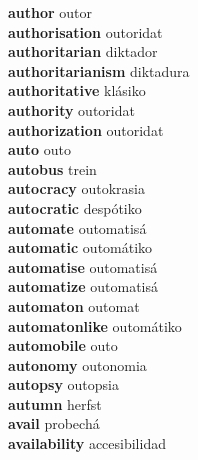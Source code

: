 \textbf{author } outor \\
\textbf{authorisation } outoridat \\
\textbf{authoritarian } diktador \\
\textbf{authoritarianism } diktadura \\
\textbf{authoritative } klásiko \\
\textbf{authority } outoridat \\
\textbf{authorization } outoridat \\
\textbf{auto } outo \\
\textbf{autobus } trein \\
\textbf{autocracy } outokrasia \\
\textbf{autocratic } despótiko \\
\textbf{automate } outomatisá \\
\textbf{automatic } outomátiko \\
\textbf{automatise } outomatisá \\
\textbf{automatize } outomatisá \\
\textbf{automaton } outomat \\
\textbf{automatonlike } outomátiko \\
\textbf{automobile } outo \\
\textbf{autonomy } outonomia \\
\textbf{autopsy } outopsia \\
\textbf{autumn } herfst \\
\textbf{avail } probechá \\
\textbf{availability } accesibilidad \\
